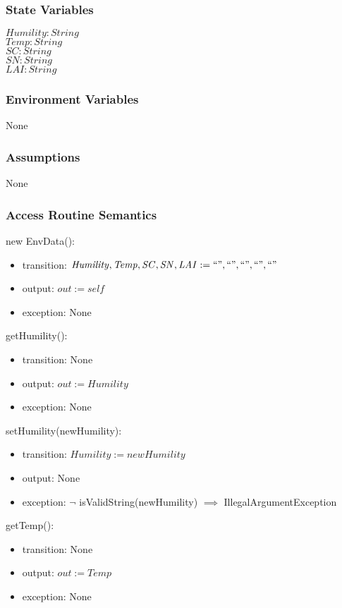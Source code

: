 \documentclass[12pt, titlepage]{article}
\begin{document}
\subsubsection{State Variables}
$\mathit{Humility: String}$\\
$\mathit{Temp: String}$\\
$\mathit{SC: String}$\\
$\mathit{SN: String}$\\
$\mathit{LAI: String}$\\

\subsubsection{Environment Variables}
None

\subsubsection{Assumptions}
None

\subsubsection{Access Routine Semantics}

\noindent new EnvData():
\begin{itemize}
\item transition: $\mathit{Humility, Temp, SC, SN, LAI := ``", ``", ``", ``", ``"}$
\item output: $\mathit{out := self}$
\item exception: None 
\end{itemize}


\newcommand{\attr}{Humility}
\noindent get\attr():
\begin{itemize}
\item transition: None
\item output: $\mathit{out := \attr}$
\item exception: None
\end{itemize}

set\attr(new\attr):
\begin{itemize}
\item transition: $\mathit{\attr := new\attr}$
\item output: None
\item exception: $\neg$ isValidString(new\attr) $\implies$
IllegalArgumentException
\end{itemize}


\renewcommand{\attr}{Temp}
\noindent get\attr():
\begin{itemize}
\item transition: None
\item output: $\mathit{out := \attr}$
\item exception: None
\end{itemize}
\end{document}
